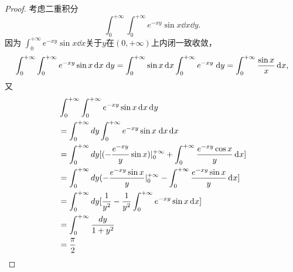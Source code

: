 \begin{proof}
考虑二重积分
$$\int_0^{+\infty}\int_0^{+\infty}e^{-xy}\sin x\dd x\dd y.$$
因为 $\int_0^{+\infty}e^{-xy}\sin x\dd x$关于$y$在$(0,+\infty)$上内闭一致收敛，
\begin{align*}
  \int_0^{+\infty}\int_0^{+\infty}e^{-xy}\sin x\mathop{}\!\mathrm{d}\mkern0.5mu x\;\mathrm{d} y
  =\int_0^{+\infty}\sin x\mathop{}\!\mathrm{d}\mkern0.5mu x\int_0^{+\infty}e^{-xy}\;\mathrm{d} y 
  =\int_0^{+\infty}\frac{\sin x}x\mathop{}\!\mathrm{d}\mkern0.5mu x,
\end{align*}
  又
\begin{align*}
  &\int_0^{+\infty}\int_0^{+\infty}e^{-xy}\sin x\mathop{}\!\mathrm{d}\mkern0.5mu x\mathop{}\!\mathrm{d}\mkern0.5mu y\\
  &=\int_0^{+\infty}dy\int_0^{+\infty}e^{-xy}\sin x\;\mathrm{d} x\mathop{}\!\mathrm{d}\mkern0.5mu x\\
  &=\int_0^{+\infty}dy[(-\frac{e^{-xy}}{y}\sin x)|_0^{+\infty}+\int_0^{+\infty}\frac{e^{-xy}\cos x}{y}\mathop{}\!\mathrm{d}\mkern0.5mu x]\\
  &=\int_0^{+\infty}dy(-\frac{e^{-xy}\sin x}{y}|_0^{+\infty}-\int_0^{+\infty}\frac{e^{-xy}\sin x}{y}\mathop{}\!\mathrm{d}\mkern0.5mu x]\\
  &=\int_0^{+\infty}dy[\frac{1}{y^2}-\frac{1}{y^2}\int_0^{+\infty}e^{-xy}\sin x\mathop{}\!\mathrm{d}\mkern0.5mu x]\\
  &=\int_0^{+\infty}\frac{dy}{1+y^2}\\
  &=\frac{\pi}{2}
\end{align*}   
\end{proof}

